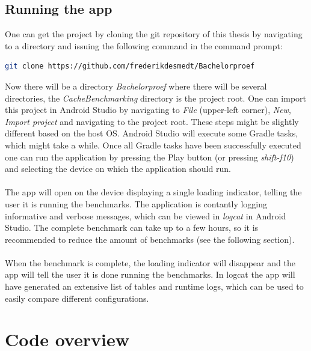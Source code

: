 \documentclass[pdftex,a4paper,12pt,twoside]{report}
\begin{document}
\subsection{Running the app}
One can get the project by cloning the git repository of this thesis by navigating to a directory and issuing the following command in the command prompt:
\begin{lstlisting}[language=sh]
git clone https://github.com/frederikdesmedt/Bachelorproef
\end{lstlisting}
Now there will be a directory \emph{Bachelorproef} where there will be several directories, the \emph{CacheBenchmarking} directory is the project root. One can import this project in Android Studio by navigating to \emph{File} (upper-left corner), \emph{New}, \emph{Import project} and navigating to the project root. These steps might be slightly different based on the host OS. Android Studio will execute some Gradle tasks, which might take a while. Once all Gradle tasks have been successfully executed one can run the application by pressing the Play button (or pressing \emph{shift-f10}) and selecting the device on which the application should run.
\\\\
The app will open on the device displaying a single loading indicator, telling the user it is running the benchmarks. The application is contantly logging informative and verbose messages, which can be viewed in \emph{logcat} in Android Studio.
The complete benchmark can take up to a few hours, so it is recommended to reduce the amount of benchmarks (see the following section).
\\\\
When the benchmark is complete, the loading indicator will disappear and the app will tell the user it is done running the benchmarks. In logcat the app will have generated an extensive list of tables and runtime logs, which can be used to easily compare different configurations.
\section{Code overview}
\end{document}
